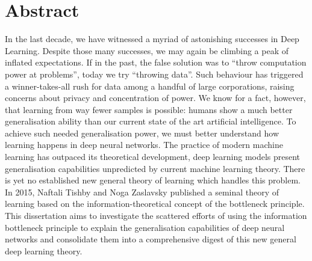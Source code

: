 \chapter*{Abstract}\label{ch:abstract}

In the last decade, we have witnessed a myriad of astonishing
successes in Deep Learning.
Despite those many successes, we may again be climbing a peak
of inflated expectations.
If in the past, the false solution was to ``throw computation
power at problems'', today we try ``throwing data''.
Such behaviour has triggered a winner-takes-all
rush for data among a handful of large corporations,
raising concerns about privacy and concentration of power.
We know for a fact, however, that learning from way fewer samples is possible: humans show a much better generalisation ability than our current state of the art artificial intelligence.
To achieve such needed generalisation power, we must
better understand how learning happens in deep neural networks.
The practice of modern machine learning has outpaced its theoretical development, deep learning models present generalisation capabilities
unpredicted by current machine learning theory.
There is yet no established new general theory of learning which handles
this problem.
In 2015, Naftali Tishby and Noga Zaslavsky published a
seminal theory of learning based on the information-theoretical concept
of the bottleneck principle.
This dissertation aims to investigate the scattered efforts of using the
information bottleneck principle to explain the generalisation capabilities
of deep neural networks and consolidate them into a comprehensive digest
of this new general deep learning theory.
